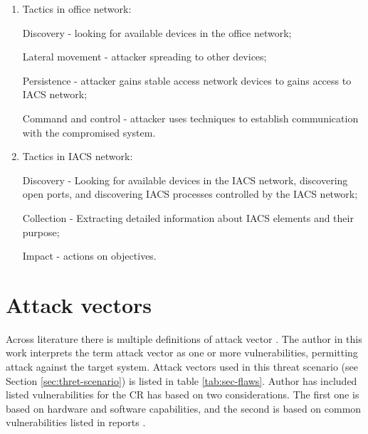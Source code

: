 \begin{enumerate}
	\item Tactics in office network:
	
	\subitem Discovery - looking for available devices in the office network;
	
	\subitem Lateral movement - attacker spreading to other devices;
	
	\subitem Persistence - attacker gains stable access network devices to gains access to IACS network;
	
	\subitem Command and control - attacker uses techniques to establish communication with the compromised system.

	\item Tactics in IACS network:
	
	\subitem Discovery - Looking for available devices in the IACS network, discovering open ports, and discovering IACS processes controlled by the IACS network;
	
	\subitem Collection - Extracting detailed information about IACS elements and their purpose;
	
	\subitem Impact - actions on objectives.
	
\end{enumerate}

\section{Attack vectors} \label{sec:attack-vectors}

Across literature there is multiple definitions of attack vector \parencite{WEB-17-kasperky-enciclopedia-atack-vector, WEB-18-pcmag-attack-vector, WEB-20-techtarget-atack-vector}. The author in this work interprets the term attack vector as one or more vulnerabilities, permitting attack against the target system. Attack vectors used in this threat scenario (see Section \ref{sec:thret-scenario}) is listed in table \ref{tab:sec-flaws}. Author has included listed vulnerabilities for the CR has based on two considerations. The first one is based on hardware and software capabilities, and the second is based on common vulnerabilities listed in reports \parencite{WEB-16-mitre-ows-2020-security-flaws, 96-kaspersky-2015-ics-vulnerability-statistics}.

